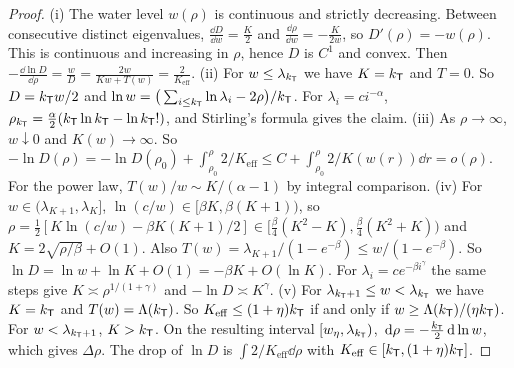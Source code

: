 \begin{proof}
(i) The water level $w(\rho)$ is continuous and strictly decreasing. Between consecutive distinct eigenvalues,
$\frac{\dd D}{\dd w}=\frac K2$ and $\frac{\dd\rho}{\dd w}=-\frac K{2w}$, so $D'(\rho)=-w(\rho)$. This is continuous and increasing in $\rho$, hence $D$ is
$C^1$ and convex. Then $-\frac{\dd\ln D}{\dd\rho}=\frac wD=\frac{2w}{Kw+T(w)}=\frac2{K_{\mathrm{eff}}}$.
(ii) For $w\le\lambda_{k_{\mathsf{T}}}$ we have $K=k_{\mathsf{T}}$ and $T=0$. So $D=k_{\mathsf{T}} w/2$ and $\ln w=\big(\sum_{i\le k_{\mathsf{T}}}\ln\lambda_i-2\rho\big)/k_{\mathsf{T}}$. For
$\lambda_i=ci^{-\alpha}$, $\rho_{k_{\mathsf{T}}}=\frac\alpha2(k_{\mathsf{T}}\ln k_{\mathsf{T}}-\ln k_{\mathsf{T}}!)$, and Stirling's formula gives the claim.
(iii) As $\rho\to\infty$, $w\downarrow0$ and $K(w)\to\infty$. So $-\ln D(\rho)=-\ln D(\rho_0)+\int_{\rho_0}^\rho2/K_{\mathrm{eff}}\le C+\int_{\rho_0}^\rho2/K(w(r))\dd r=o(\rho)$.
For the power law, $T(w)/w\sim K/(\alpha-1)$ by integral comparison.
(iv) For $w\in(\lambda_{K+1},\lambda_K]$, $\ln(c/w)\in[\beta K,\beta(K+1))$, so $\rho=\frac12[K\ln(c/w)-\beta K(K+1)/2]\in[\frac\beta4(K^2-K),\frac\beta4(K^2+K))$ and
$K=2\sqrt{\rho/\beta}+O(1)$. Also $T(w)=\lambda_{K+1}/(1-e^{-\beta})\le w/(1-e^{-\beta})$. So $\ln D=\ln w+\ln K+O(1)=-\beta K+O(\ln K)$.
For $\lambda_i=ce^{-\beta i^\gamma}$ the same steps give $K\asymp\rho^{1/(1+\gamma)}$ and $-\ln D\asymp K^\gamma$.
(v) For $\lambda_{k_{\mathsf{T}}+1}\le w<\lambda_{k_{\mathsf{T}}}$ we have $K=k_{\mathsf{T}}$ and $T(w)=\Lambda(k_{\mathsf{T}})$. So $K_{\mathrm{eff}}\le(1+\eta)k_{\mathsf{T}}$ if and only if
$w\ge\Lambda(k_{\mathsf{T}})/(\eta k_{\mathsf{T}})$. For $w<\lambda_{k_{\mathsf{T}}+1}$, $K>k_{\mathsf{T}}$. On the resulting interval $[w_\eta,\lambda_{k_{\mathsf{T}}})$,
$\,\mathrm{d}\rho=-\frac{k_{\mathsf{T}}}2\,\mathrm{d}\ln w$, which gives $\Delta\rho$. The drop of $\ln D$ is $\int2/K_{\mathrm{eff}}\dd\rho$ with $K_{\mathrm{eff}}\in[k_{\mathsf{T}},(1+\eta)k_{\mathsf{T}}]$.
\end{proof}

